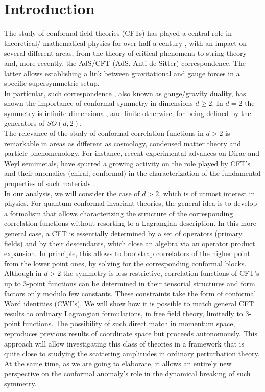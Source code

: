\documentclass[a4paper,11pt,openright,twoside]{book}
\numberwithin{equation}{section}
\renewcommand{\chaptermark}[1]{\markboth{#1}{}}
\begin{document}
\chapter*{Introduction}
\chaptermark{Introduction}

The study of conformal field theories (CFTs) has played a central role in theoretical/ mathematical physics for over half a century \cite{Kastrup:2008jn,DiFrancesco:1997nk}, with an impact on several different areas, from the theory of critical phenomena to string theory and, more recently, the AdS/CFT 
(AdS, Anti de Sitter)  correspondence. The latter allows establishing a link between gravitational and gauge forces in a specific supersymmetric setup.\\
In particular, such correspondence \cite{Maldacena:2003nj}, also known as gauge/gravity duality, has shown the importance of conformal symmetry in dimensions $d \geq 2$.
In $d=2$ the symmetry is infinite dimensional, and finite otherwise, for being defined by the generators of $SO(d,2)$.  \\
The relevance of the study of conformal correlation functions in $d>2$ 
is remarkable in areas as different as cosmology, condensed matter theory and particle phenomenology. For instance, recent experimental advances on Dirac and Weyl semimetals, have spurred a growing activity on the role played by CFT's and their anomalies (chiral, conformal) in the characterization of the fundamental properties of such materials \cite{Chernodub:2013kya,Ambrus:2019khr,Chernodub:2019tsx,Arjona:2019lxz,Gooth:2017mbd}.  \\
In our analysis, we will consider the case of $d > 2$, which is of utmost interest in physics. 
For quantum conformal invariant theories, the general idea is to develop a formalism that allows characterizing the structure of the corresponding correlation functions without resorting to a Lagrangian description. In this more general case, a CFT is essentially determined by a set of operators (primary fields) and by their descendants, which close an algebra via an operator product expansion. In principle, this allows to bootstrap correlators of the higher point from the lower point ones, by solving for the corresponding conformal blocks.    \\
Although in $d> 2$ the symmetry is less restrictive, correlation functions of CFT's up to 3-point functions can be determined in their tensorial structures and form factors only modulo few constants. These constraints take the form of conformal Ward identities (CWI's). 
We will show how it is possible to match general CFT results to ordinary Lagrangian formulations, in free field theory, limitedly to 3-point functions. The possibility of such direct match in momentum space, reproduces previous results of coordinate space \cite{Osborn:1993cr} but proceeds autonomously. This approach will allow investigating this class of theories in a framework that is quite close to studying the scattering amplitudes in ordinary perturbation theory. At the same time, as we are going to elaborate, it allows an entirely new perspective on the conformal anomaly's role in the dynamical breaking of such symmetry.  \\
\end{document}
